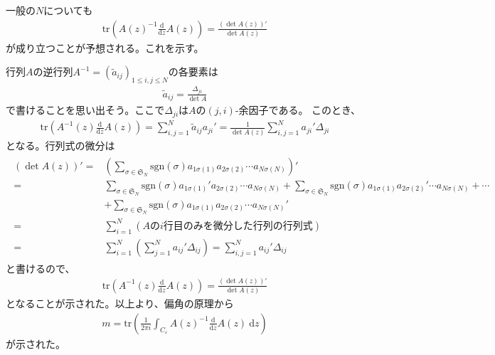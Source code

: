 \documentclass{jsarticle}
\def\diff{\textrm{d}}
\begin{document}
一般の$N$についても
\begin{align*}
\mathrm{tr}\left(A(z)^{-1}\frac{\diff}{\diff z}A(z)\right)=\frac{\left(\det A(z)\right)'}{\det A(z)}
\end{align*}
が成り立つことが予想される。これを示す。

行列$A$の逆行列$A^{-1}=(\tilde{a}_{ij})_{1\leq i,j\leq N}$の各要素は
\begin{align*}
\tilde{a}_{ij}=\frac{\Delta_{ji}}{\det A}
\end{align*}
で書けることを思い出そう。ここで$\Delta_{ji}$は$A$の$(j,i)$-余因子である。
このとき、
\begin{align*}
\mathrm{tr}\left(A^{-1}(z)\frac{\diff}{\diff z}A(z)\right)
=\sum_{i,j=1}^{N}\tilde{a}_{ij}a_{ji}'
=\frac{1}{\det A(z)}\sum_{i,j=1}^{N}a_{ji}'\Delta_{ji}
\end{align*}
となる。行列式の微分は
\begin{align*}
\begin{aligned}
    \left(\det A(z)\right)'=&\left(\sum_{\sigma\in\mathfrak{S}_{N}}\mathrm{sgn}(\sigma)a_{1\sigma(1)}a_{2\sigma(2)}\cdots a_{N\sigma(N)}\right)'\\
    =&\sum_{\sigma\in\mathfrak{S}_{N}}\mathrm{sgn}(\sigma)a_{1\sigma(1)}'a_{2\sigma(2)}\cdots a_{N\sigma(N)}
    +\sum_{\sigma\in\mathfrak{S}_{N}}\mathrm{sgn}(\sigma)a_{1\sigma(1)}a_{2\sigma(2)}'\cdots a_{N\sigma(N)}+\cdots\\
    &+\sum_{\sigma\in\mathfrak{S}_{N}}\mathrm{sgn}(\sigma)a_{1\sigma(1)}a_{2\sigma(2)}\cdots a_{N\sigma(N)}'\\
    =&\sum_{i=1}^{N}(A\mathrm{の}i\mathrm{行目のみを微分した行列の行列式})\\
    =&\sum_{i=1}^{N}\left(\sum_{j=1}^{N}a_{ij}'\Delta_{ij}\right)
    =\sum_{i,j=1}^{N}a_{ij}'\Delta_{ij}
\end{aligned}
\end{align*}
と書けるので、
\begin{align*}
\mathrm{tr}\left(A^{-1}(z)\frac{\diff}{\diff z}A(z)\right)=\frac{\left(\det A(z)\right)'}{\det A(z)}
\end{align*}
となることが示された。以上より、偏角の原理から
\begin{align*}
    m=\mathrm{tr}\left(\frac{1}{2\pi i}\int_{C_{\varepsilon}}A(z)^{-1}\frac{\diff}{\diff z}A(z)~\diff z\right)
\end{align*}
が示された。
\end{document}
